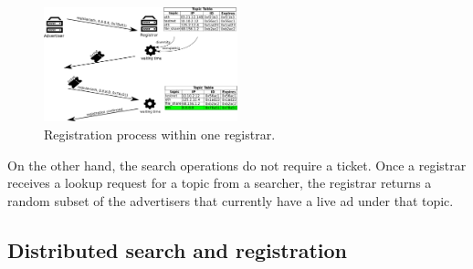 

\begin{figure}
    \includegraphics[width=0.5\textwidth]{img/registration}
    \caption{Registration process within one registrar.}
    \label{fig:registration}
\end{figure}

On the other hand, the search operations do not require a ticket. Once a registrar receives a lookup request for a topic from a searcher, the registrar returns a random subset of the advertisers that currently have a live ad under that topic. 

\subsection{Distributed search and registration}

